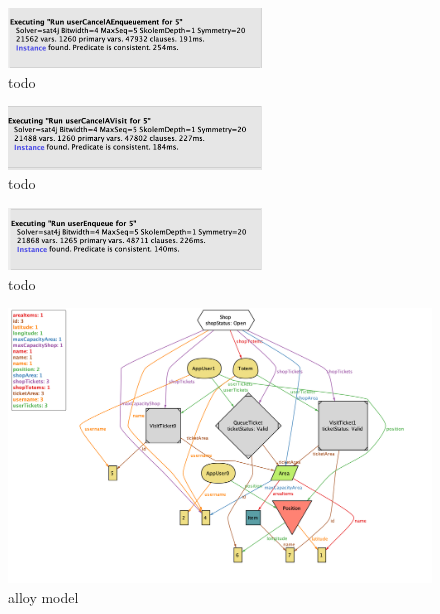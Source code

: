 \begin{figure}[h!]
    \centering
    \includegraphics[width=0.6\textwidth]{Images/alloy/usercancelsanenqueuement.png}
    \caption{\label{fig:usercancelsanenqueuementalloy}{todo}}
\end{figure}

\begin{figure}[h!]
    \centering
    \includegraphics[width=0.6\textwidth]{Images/alloy/usercancelsavisit.png}
    \caption{\label{fig:usercancelsavisitalloy}{todo}}
\end{figure}

\begin{figure}[h!]
    \centering
    \includegraphics[width=0.6\textwidth]{Images/alloy/userenqueue.png}
    \caption{\label{fig:usernenqueuealloy}{todo}}
\end{figure}

\begin{figure}[h!]
    \centering
    \includegraphics[width=\textwidth]{Images/alloy/alloymodel.png}
    \caption{\label{fig:alloymodel}{alloy model}}
\end{figure}

\FloatBarrier